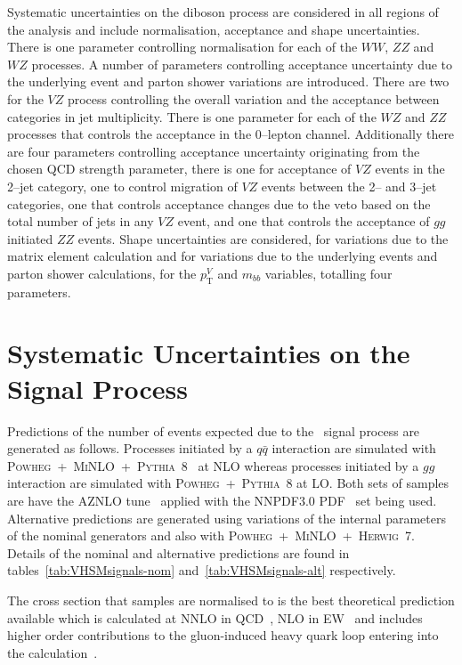 Systematic uncertainties on the diboson process are considered in all regions of
the analysis and include normalisation, acceptance and shape uncertainties.
There is one parameter controlling normalisation for each of the $WW$, $ZZ$ and
$WZ$ processes. A number of parameters controlling acceptance uncertainty due to
the underlying event and parton shower variations are introduced. There are two
for the $VZ$ process controlling the overall variation and the acceptance
between categories in jet multiplicity. There is one parameter for each of the
$WZ$ and $ZZ$ processes that controls the acceptance in the 0--lepton channel.
Additionally there are four parameters controlling acceptance uncertainty
originating from the chosen QCD strength parameter, there is one for acceptance
of $VZ$ events in the 2--jet category, one to control migration of $VZ$ events
between the 2-- and 3--jet categories, one that controls acceptance changes due
to the veto based on the total number of jets in any $VZ$ event, and one that
controls the acceptance of $gg$ initiated $ZZ$ events. Shape uncertainties are
considered, for variations due to the matrix element calculation and for
variations due to the underlying events and parton shower calculations, for the
$p_{\mathrm{T}}^V$ and $m_{bb}$ variables, totalling four parameters.

\section{Systematic Uncertainties on the Signal Process}

Predictions of the number of events expected due to the \VHbb\ signal process
are generated as follows. Processes initiated by a $q\bar{q}$ interaction are
simulated with
\textsc{Powheg}~+~\textsc{MiNLO}~+~\textsc{Pythia}~8~\cite{Luisoni2013,
  Sjostrand2008852} at NLO whereas processes initiated by a $gg$ interaction are
simulated with \textsc{Powheg}~+~\textsc{Pythia}~8 at LO. Both sets of samples
are have the AZNLO tune~\cite{Aad:2014xaa} applied with the NNPDF3.0
PDF~\cite{Ball:2014uwa} set being used. Alternative predictions are generated 
using variations of the internal parameters of the nominal generators and also
with \textsc{Powheg}~+~\textsc{MiNLO}~+~\textsc{Herwig}~7. Details of the
nominal and alternative predictions are found in
tables~\ref{tab:VHSMsignals-nom} and~\ref{tab:VHSMsignals-alt} respectively.

The cross section that samples are normalised to is the best theoretical
prediction available which is calculated at NNLO in QCD~\cite{Brein:2003wg,
  Brein:2011vx}, NLO in EW~\cite{Denner:2012sx} and includes higher order
contributions to the gluon-induced heavy quark loop entering into the \ZH
calculation~\cite{Altenkamp:2012sx}.

